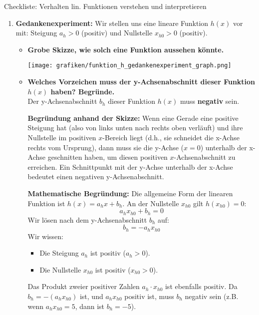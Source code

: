 \begin{loesungsumgebung}{Checkliste: Verhalten lin. Funktionen verstehen und interpretieren}
\begin{enumerate}[label=(\alph*)]
    \item \textbf{Gedankenexperiment:}
    Wir stellen uns eine lineare Funktion $h(x)$ vor mit: Steigung $a_h > 0$ (positiv) und Nullstelle $x_{h0} > 0$ (positiv).
    \begin{itemize}
        \item \textbf{Grobe Skizze, wie solch eine Funktion aussehen könnte.}
        \begin{center}
        \texttt{[image: grafiken/funktion\_h\_gedankenexperiment\_graph.png]}
        \label{fig:h_gedankenexperiment_graph}
        \end{center}

        \item \textbf{Welches Vorzeichen muss der y-Achsenabschnitt dieser Funktion $h(x)$ haben? Begründe.} \\
        Der y-Achsenabschnitt $b_h$ dieser Funktion $h(x)$ muss \textbf{negativ} sein.

        \textbf{Begründung anhand der Skizze:}
        Wenn eine Gerade eine positive Steigung hat (also von links unten nach rechts oben verläuft) und ihre Nullstelle im positiven $x$-Bereich liegt (d.h., sie schneidet die x-Achse rechts vom Ursprung), dann muss sie die y-Achse ($x=0$) unterhalb der x-Achse geschnitten haben, um diesen positiven $x$-Achsenabschnitt zu erreichen. Ein Schnittpunkt mit der y-Achse unterhalb der x-Achse bedeutet einen negativen y-Achsenabschnitt.

        \textbf{Mathematische Begründung:}
        Die allgemeine Form der linearen Funktion ist $h(x) = a_h x + b_h$.
        An der Nullstelle $x_{h0}$ gilt $h(x_{h0}) = 0$:
        $$ a_h x_{h0} + b_h = 0 $$
        Wir lösen nach dem y-Achsenabschnitt $b_h$ auf:
        $$ b_h = -a_h x_{h0} $$
        Wir wissen:
        \begin{itemize}
            \item Die Steigung $a_h$ ist positiv ($a_h > 0$).
            \item Die Nullstelle $x_{h0}$ ist positiv ($x_{h0} > 0$).
        \end{itemize}
        Das Produkt zweier positiver Zahlen $a_h \cdot x_{h0}$ ist ebenfalls positiv.
        Da $b_h = -(a_h x_{h0})$ ist, und $a_h x_{h0}$ positiv ist, muss $b_h$ negativ sein (z.B. wenn $a_h x_{h0} = 5$, dann ist $b_h = -5$).
    \end{itemize}
\end{enumerate}

\end{loesungsumgebung}